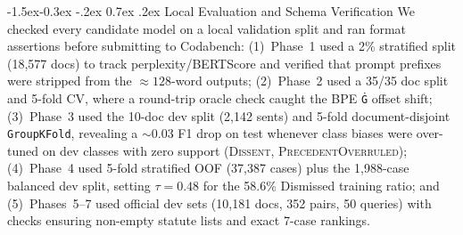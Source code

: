 \documentclass[11pt, oneside]{article}
\makeatletter
\renewcommand\subsection{\@startsection{subsection}{2}{\z@}%
  {-1.5ex\@plus -0.3ex \@minus -.2ex}%
  {0.7ex \@plus .2ex}%
  {\normalfont\large\bfseries}}
\makeatother
\begin{document}
\subsection{Local Evaluation and Schema Verification}
We checked every candidate model on a local validation split and ran format assertions before submitting to Codabench: (1)~Phase~1 used a 2\% stratified split (18,577 docs) to track perplexity/BERTScore and verified that prompt prefixes were stripped from the $\approx 128$-word outputs; (2)~Phase~2 used a 35/35 doc split and 5-fold CV, where a round-trip oracle check caught the BPE \texttt{Ġ} offset shift; (3)~Phase~3 used the 10-doc dev split (2,142 sents) and 5-fold document-disjoint \texttt{GroupKFold}, revealing a $\sim 0.03$ F1 drop on test whenever class biases were over-tuned on dev classes with zero support (\textsc{Dissent}, \textsc{PrecedentOverruled}); (4)~Phase~4 used 5-fold stratified OOF (37,387 cases) plus the 1,988-case balanced dev split, setting $\tau=0.48$ for the 58.6\% Dismissed training ratio; and (5)~Phases~5--7 used official dev sets (10,181 docs, 352 pairs, 50 queries) with checks ensuring non-empty statute lists and exact 7-case rankings.
\end{document}
